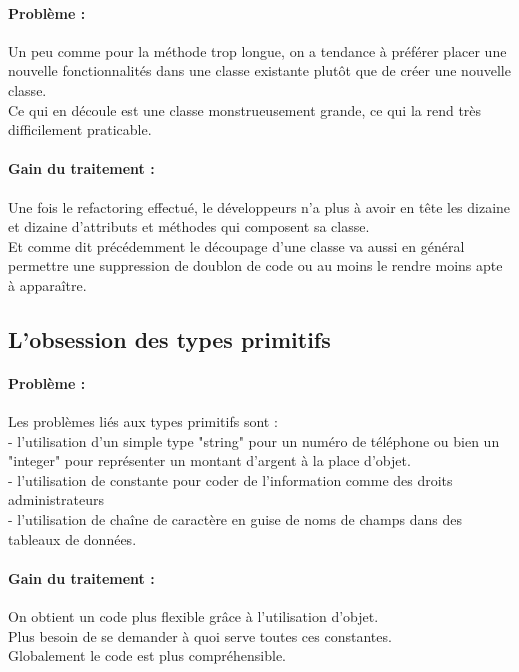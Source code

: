 \documentclass[a4paper,twoside,12pt,openright]{report}
\begin{document}
\paragraph{Problème :}
Un peu comme pour la méthode trop longue, on a tendance à préférer placer une nouvelle fonctionnalités dans une classe existante plutôt que de créer une nouvelle classe.\\
Ce qui en découle est une classe monstrueusement grande, ce qui la rend très difficilement praticable.\\

\paragraph{Gain du traitement :}
Une fois le refactoring effectué, le développeurs n'a plus à avoir en tête les dizaine et dizaine d'attributs et méthodes qui composent sa classe.\\
Et comme dit précédemment le découpage d'une classe va aussi en général permettre une suppression de doublon de code ou au moins le rendre moins apte à apparaître.\\

\subsection{L'obsession des types primitifs}
\paragraph{Problème :}
Les problèmes liés aux types primitifs sont :\\
- l'utilisation d'un simple type "string" pour un numéro de téléphone ou bien un "integer" pour représenter un montant d'argent à la place d'objet.\\
- l'utilisation de constante pour coder de l'information comme des droits administrateurs\\
- l'utilisation de chaîne de caractère en guise de noms de champs dans des tableaux de données.\\

\paragraph{Gain du traitement :}
On obtient un code plus flexible grâce à l'utilisation d'objet.\\
Plus besoin de se demander à quoi serve toutes ces constantes.\\
Globalement le code est plus compréhensible.\\
\end{document}
